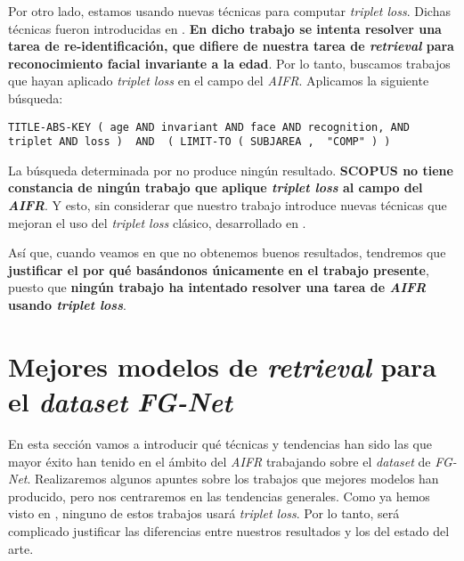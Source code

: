 Por otro lado, estamos usando nuevas técnicas para computar \textit{triplet loss}. Dichas técnicas fueron introducidas en \cite{informatica:principal}. \textbf{En dicho trabajo se intenta resolver una tarea de re-identificación, que difiere de nuestra tarea de \textit{retrieval} para reconocimiento facial invariante a la edad}. Por lo tanto, buscamos trabajos que hayan aplicado \textit{triplet loss} en el campo del \textit{AIFR}. Aplicamos la siguiente búsqueda:

\begin{lstlisting}[caption=Keywords usandos para la búsqueda de trabajos que combinen \textit{AIFR} y \textit{triplet loss} en \textit{SCOPUS}, label=code:scopus_search_especifico, captionpos=b]
    TITLE-ABS-KEY ( age AND invariant AND face AND recognition, AND triplet AND loss )  AND  ( LIMIT-TO ( SUBJAREA ,  "COMP" ) )
\end{lstlisting}

La búsqueda determinada por  no produce ningún resultado. \textbf{SCOPUS no tiene constancia de ningún trabajo que aplique \textit{triplet loss} al campo del \textit{AIFR}}. Y esto, sin considerar que nuestro trabajo introduce nuevas técnicas que mejoran el uso del \textit{triplet loss} clásico, desarrollado en .

Así que, cuando veamos en  que no obtenemos buenos resultados, tendremos que \textbf{justificar el por qué basándonos únicamente en el trabajo presente}, puesto que \textbf{ningún trabajo ha intentado resolver una tarea de \textit{AIFR} usando \textit{triplet loss}}.

\section{Mejores modelos de \textit{retrieval} para el \textit{dataset} \textit{FG-Net}} \label{isec:mejores_modelos_estado_arte}

En esta sección vamos a introducir qué técnicas y tendencias han sido las que mayor éxito han tenido en el ámbito del \textit{AIFR} trabajando sobre el \textit{dataset} de \textit{FG-Net}. Realizaremos algunos apuntes sobre los trabajos que mejores modelos han producido, pero nos centraremos en las tendencias generales.
Como ya hemos visto en , ninguno de estos trabajos usará \textit{triplet loss}. Por lo tanto, será complicado justificar las diferencias entre nuestros resultados y los del estado del arte.

